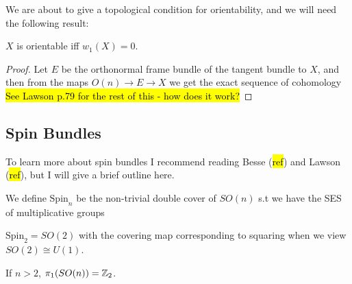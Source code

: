 \documentclass{article}
\begin{document}
We are about to give a topological condition for orientability, and we will need the following result:

\begin{comment} I think this is wrong. 
\begin{lemma}\label{lemma: 0-Cohomology}
If $M$ is a manifold with $r$ connected components, $H^0(M,F_2) \cong F_2^{r-1}$
\end{lemma}
\begin{proof}
Thinking of $H^0$ as global sections, we know that there is a choice of $\pm 1$ for the value of a section on each component. The overall sign of the section doesn't matter, so we have $r-1$ choices of signs. 
\end{proof}
\end{comment}

\begin{prop}
	$X$ is orientable iff $w_1(X)=0$. 
\end{prop}
\begin{proof}
	Let $E$ be the orthonormal frame bundle of the tangent bundle to $X$, and then from the maps $O(n) \to E \to X$ we get the exact sequence of cohomology
	\hl{See Lawson p.79 for the rest of this - how does it work?}
\end{proof}
\subsection{Spin Bundles}
To learn more about spin bundles I recommend reading Besse (\hl{ref}) and Lawson (\hl{ref}), but I will give a brief outline here. 

\begin{definition}
	We define $\text{Spin}_n$ be the non-trivial double cover of $SO(n)$ s.t we have the SES of multiplicative groups 
\end{definition}

\begin{example}
	$\text{Spin}_2 = SO(2)$ with the covering map corresponding to squaring when we view $SO(2) \cong U(1)$.
\end{example}

\begin{lemma}
	If $n>2$, $\pi_1(SO(n)) = \mathbb{Z}_2$. 
\end{lemma}
\end{document}

